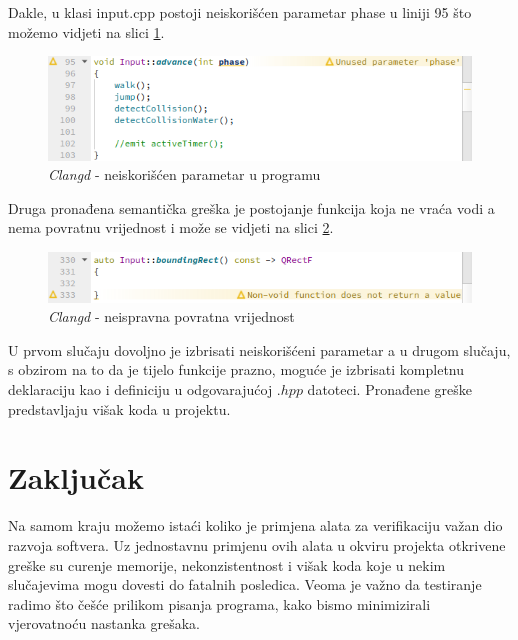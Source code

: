 \documentclass[a4paper]{article}
\begin{document}
Dakle, u klasi input.cpp postoji neiskorišćen parametar phase u liniji 95 što možemo vidjeti na slici \ref{fig:c3}.
	\begin{figure}[h!]
		\caption{\textit{Clangd} - neiskorišćen parametar u programu}
		\label{fig:c3}
		\includegraphics[scale=0.6]{../Clangd/c3.png}
	\end{figure}
Druga pronađena semantička greška je postojanje funkcija koja ne vraća vodi a nema povratnu vrijednost i može se vidjeti na slici \ref{fig:c4}.
	 \begin{figure}[h!]
		\caption{\textit{Clangd} - neispravna povratna vrijednost}
		\label{fig:c4}
		\includegraphics[scale=0.6]{../Clangd/c4.png}
	\end{figure}
	
	U prvom slučaju dovoljno je izbrisati neiskorišćeni parametar a u drugom slučaju, s obzirom na to da je tijelo funkcije prazno, moguće je izbrisati kompletnu deklaraciju kao i definiciju u odgovarajućoj $.hpp$ datoteci. Pronađene greške predstavljaju višak koda u projektu.

\section{Zaključak}
\label{sec:zakljucak}
	
Na samom kraju možemo istaći koliko je primjena alata za verifikaciju važan dio razvoja softvera. Uz jednostavnu primjenu ovih alata u okviru projekta otkrivene greške su curenje memorije, nekonzistentnost i višak koda koje u nekim slučajevima mogu dovesti do fatalnih posledica. Veoma je važno da testiranje radimo što češće prilikom pisanja programa, kako bismo minimizirali vjerovatnoću nastanka grešaka. 
	

\newpage
{}
\appendix
 


	
\end{document}
